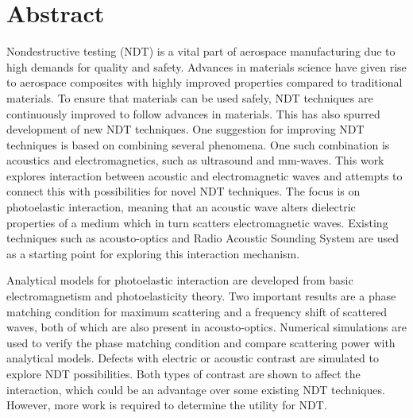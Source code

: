 \documentclass[11pt,twoside]{eitExjobb}
\begin{document}
	
	\newcommand{\addref}{\todo[color=red!40]{Citation needed!}}
	\newcommand{\todoext}[1]{\todo[inline, color=yellow]{#1}}
	\newcommand{\todoint}[2][]{\todo[#1]{#2}}
	
	\newcommand{\mrm}[1]{\mathrm{#1}}
	\newcommand{\eu}{\mrm{e}}
	\newcommand{\iu}{\mrm{i}}
	
	
	
	\MakeTitlePage  %
	
	\frontmatter    %
	
	\chapter*{Abstract}
	Nondestructive testing (NDT) is a vital part of aerospace manufacturing due to high demands for quality and safety. Advances in materials science have given rise to aerospace composites with highly improved properties compared to traditional materials. To ensure that materials can be used safely, NDT techniques are continuously improved to follow advances in materials. This has also spurred development of new NDT techniques. One suggestion for improving NDT techniques is based on combining several phenomena. One such combination is acoustics and electromagnetics, such as ultrasound and mm-waves. This work explores interaction between acoustic and electromagnetic waves and attempts to connect this with possibilities for novel NDT techniques. The focus is on photoelastic interaction, meaning that an acoustic wave alters dielectric properties of a medium which in turn scatters electromagnetic waves. Existing techniques such as acousto-optics and Radio Acoustic Sounding System are used as a starting point for exploring this interaction mechanism.
	
	Analytical models for photoelastic interaction are developed from basic electromagnetism and photoelasticity theory. Two important results are a phase matching condition for maximum scattering and a frequency shift of scattered waves, both of which are also present in acousto-optics. Numerical simulations are used to verify the phase matching condition and compare scattering power with analytical models. Defects with electric or acoustic contrast are simulated to explore NDT possibilities. Both types of contrast are shown to affect the interaction, which could be an advantage over some existing NDT techniques. However, more work is required to determine the utility for NDT.
	
\end{document}
